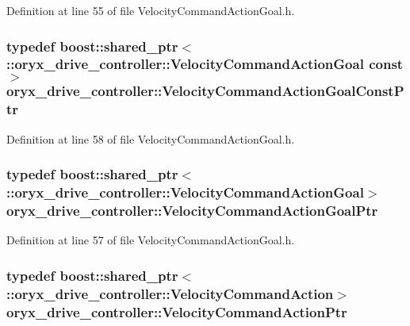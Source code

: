 \-Definition at line 55 of file \-Velocity\-Command\-Action\-Goal.\-h.

\subsubsection[{\-Velocity\-Command\-Action\-Goal\-Const\-Ptr}]{\setlength{\rightskip}{0pt plus 5cm}typedef boost\-::shared\-\_\-ptr$<$ \-::{\bf oryx\-\_\-drive\-\_\-controller\-::\-Velocity\-Command\-Action\-Goal} const$>$ {\bf oryx\-\_\-drive\-\_\-controller\-::\-Velocity\-Command\-Action\-Goal\-Const\-Ptr}}\label{namespaceoryx__drive__controller_a60de9acb24a22a4d8e546362c2eb1ead}


\-Definition at line 58 of file \-Velocity\-Command\-Action\-Goal.\-h.

\subsubsection[{\-Velocity\-Command\-Action\-Goal\-Ptr}]{\setlength{\rightskip}{0pt plus 5cm}typedef boost\-::shared\-\_\-ptr$<$ \-::{\bf oryx\-\_\-drive\-\_\-controller\-::\-Velocity\-Command\-Action\-Goal}$>$ {\bf oryx\-\_\-drive\-\_\-controller\-::\-Velocity\-Command\-Action\-Goal\-Ptr}}\label{namespaceoryx__drive__controller_a7e798a4de0a2df43b251dcf73d6d57f8}


\-Definition at line 57 of file \-Velocity\-Command\-Action\-Goal.\-h.

\subsubsection[{\-Velocity\-Command\-Action\-Ptr}]{\setlength{\rightskip}{0pt plus 5cm}typedef boost\-::shared\-\_\-ptr$<$ \-::{\bf oryx\-\_\-drive\-\_\-controller\-::\-Velocity\-Command\-Action}$>$ {\bf oryx\-\_\-drive\-\_\-controller\-::\-Velocity\-Command\-Action\-Ptr}}\label{namespaceoryx__drive__controller_ae4b9fe30f9876d64f031fa0f69b82299}


